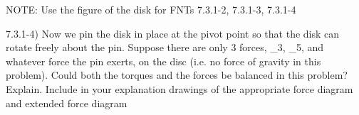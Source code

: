 \label{fnt7.3.1-4}

NOTE: Use the figure of the disk for FNTs 7.3.1-2, 7.3.1-3, 7.3.1-4

7.3.1-4) Now we pin the disk in place at the pivot point so that the disk can rotate freely about the pin.  Suppose there are only 3 forces, _3, _5, and whatever force the pin exerts, on the disc (i.e. no force of gravity in this problem).  Could both the torques and the forces be balanced in this problem?  Explain.  Include in your explanation drawings of the appropriate force diagram and extended force diagram